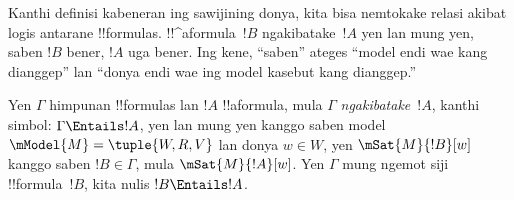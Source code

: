 \documentclass[../../../include/open-logic-section]{subfiles}
\begin{document}


\begin{explain}
  Kanthi definisi kabeneran ing sawijining donya, kita bisa nemtokake
  relasi akibat logis antarane !!{formula}s. !!^a{formula}~$!B$
  ngakibatake~$!A$ yen lan mung yen, saben $!B$ bener, $!A$ uga
  bener. Ing kene, ``saben'' ateges ``model endi wae kang dianggep''
  lan ``donya endi wae ing model kasebut kang dianggep.''
\end{explain}

\begin{defn}
  Yen $\Gamma$ himpunan !!{formula}s lan $!A$ !!a{formula}, mula
  $\Gamma$ \emph{ngakibatake}~$!A$, kanthi simbol: $\Gamma \Entails !A$, yen
  lan mung yen kanggo saben model $\mModel{M} = \tuple{W, R, V}$ lan donya
  $w \in W$, yen $\mSat{M}{!B}[w]$ kanggo saben $!B \in \Gamma$, mula
  $\mSat{M}{!A}[w]$. Yen $\Gamma$ mung ngemot siji !!{formula}~$!B$,
  kita nulis $!B \Entails !A$.
\end{defn}
\end{document}
